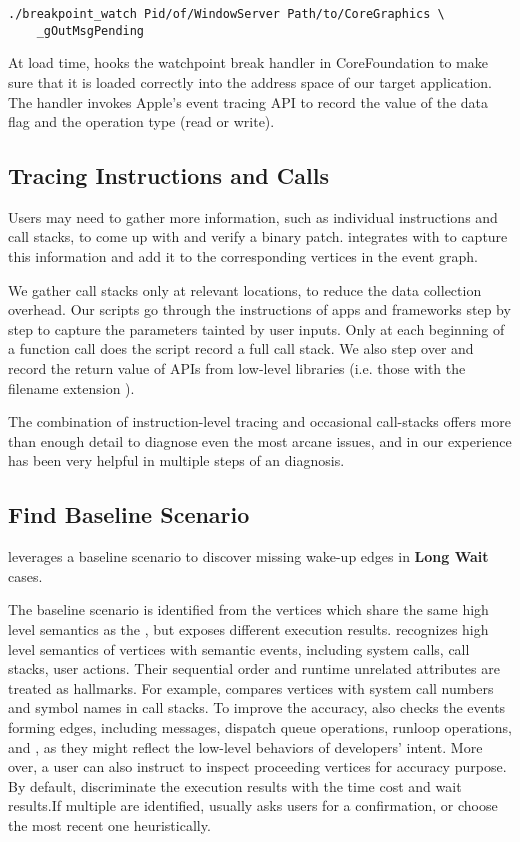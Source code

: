 \begin{lstlisting}
./breakpoint_watch Pid/of/WindowServer Path/to/CoreGraphics \
	_gOutMsgPending
\end{lstlisting}

At load time, \xxx hooks the watchpoint break handler in CoreFoundation to
make sure that it is loaded correctly into the address space of our target
application. The handler invokes Apple's event tracing API to record the value
of the data flag and the operation type (read or write).

\subsection{Tracing Instructions and Calls}

Users may need to gather more information, such as individual instructions and
call stacks, to come up with and verify a binary patch. \xxx integrates with
\vv{lldb} to capture this information and add it to the corresponding vertices
in the event graph.

We gather call stacks only at relevant locations, to reduce the data collection
overhead. Our \vv{lldb} scripts go through the instructions of apps and
frameworks step by step to capture the parameters tainted by user inputs. Only
at each beginning of a function call does the script record a full call stack.
We also step over and record the return value of APIs from low-level libraries
(i.e. those with the filename extension \vv{.dylib}).

The combination of instruction-level tracing and occasional call-stacks offers
more than enough detail to diagnose even the most arcane issues, and in our
experience has been very helpful in multiple steps of an \xxx diagnosis.

\subsection{Find Baseline Scenario}

\xxx leverages a baseline scenario to discover missing wake-up edges in
\textbf{Long Wait} cases. 

The baseline scenario is identified from the vertices which share the same high
level semantics as the \spinningnode, but exposes different execution results.
\xxx recognizes high level semantics of vertices with semantic events, including
system calls, call stacks, user actions. Their sequential order and runtime
unrelated attributes are treated as hallmarks. For example, \xxx compares
vertices with system call numbers and symbol names in call stacks. To improve
the accuracy, \xxx also checks the events forming edges, including messages,
dispatch queue operations, runloop operations, \dataflagread and \dataflagwrite,
as they might reflect the low-level behaviors of developers' intent. More over,
a user can also instruct \xxx to inspect proceeding vertices for accuracy
purpose. By default, \xxx discriminate the execution results with the time cost
and wait results.If multiple \similarnode are identified, \xxx usually asks
users for a confirmation, or choose the most recent one heuristically.
